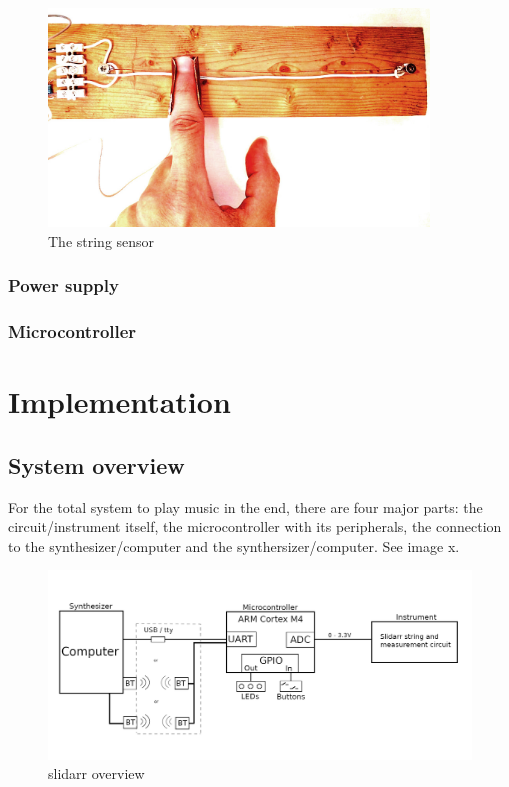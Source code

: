 \documentclass{article}
\begin{document}
\begin{figure}[h]
  \centering
  \includegraphics[width=0.9\textwidth]{string-sensor}
  \caption{The string sensor}
  \label{fig:string_sensor}
\end{figure}

\subsubsection{Power supply}

\subsubsection{Microcontroller}

\section{Implementation}

\subsection{System overview}
For the total system to play music in the end, there are four major parts: the circuit/instrument itself, the microcontroller with its peripherals, the connection to the synthesizer/computer and the synthersizer/computer. See image x.

\begin{figure}[ht]
  \centering
  \includegraphics[width=1\textwidth]{BasicSystemOverview.png}
  \caption{slidarr overview}
  \label{fig:slidarr overview}
\end{figure}
\end{document}
